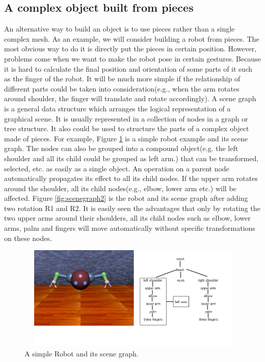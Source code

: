 \subsection{A complex object built from pieces}
An alternative way to build an object is to use pieces rather than a single complex mesh. As an example, we will consider building a robot from pieces. The most obvious way to do it is directly put the
pieces in certain position. However, problems come when we want to make
the robot pose in certain gestures. Because it is hard to calculate the
final position and orientation of some parts of it such as the finger
of the robot. It will be
much more simple if the relationship of different parts could be
taken into consideration(e.g., when the arm rotates around shoulder,
the finger will translate and rotate accordingly). 
A scene graph is a general data structure which arranges the logical representation of a
graphical scene. 
It is usually represented in a collection of nodes in
a graph or tree structure. It also could be used to structure the parts of a complex object made of pieces. For example, Figure \ref{fig:graph3}  is a simple robot example and
its scene graph.  The nodes can also be grouped into a compound object(e.g. the left shoulder and
all its child could be grouped as left arm.) that can be
transformed, selected, etc. as easily as a single object.   
An operation on a parent node automatically
propagates its effect to all its child nodes. If the upper arm rotates around the shoulder, all its
child nodes(e.g., elbow, lower arm etc.) will be affected. Figure
\ref{fig:scenegraph2} is the robot and its scene graph after adding two
rotation R1 and R2. It is easily seen the advantages that only by
rotating the two upper arms around their shoulders, all its child
nodes such as elbow, lower arms, palm and fingers will move
automatically without specific transformations on these nodes.
\begin{figure}[ht!]
\centering
\includegraphics[width=12cm,height=5cm]{figures/figure3.png}
\caption{A simple Robot and its scene graph.}
\label{fig:graph3}
\end{figure}
